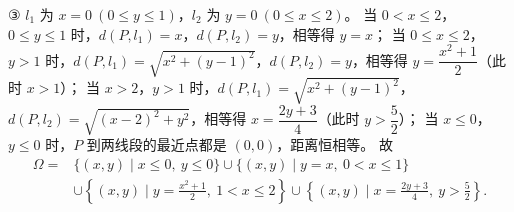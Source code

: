 \begin{answer}
③ $l_1$ 为 $x=0\ (0\leqslant y\leqslant1)$，$l_2$ 为 $y=0\ (0\leqslant x\leqslant2)$。
当 $0<x\leqslant2$，$0\leqslant y\leqslant1$ 时，$d(P,l_1)=x$，$d(P,l_2)=y$，相等得 $y=x$；
当 $0\leqslant x\leqslant2$，$y>1$ 时，$d(P,l_1)=\sqrt{x^2+(y-1)^2}$，$d(P,l_2)=y$，相等得 $y=\dfrac{x^2+1}2$（此时 $x>1$）；
当 $x>2$，$y>1$ 时，$d(P,l_1)=\sqrt{x^2+(y-1)^2}$，$d(P,l_2)=\sqrt{(x-2)^2+y^2}$，相等得 $x=\dfrac{2y+3}4$（此时 $y>\dfrac52$）；
当 $x\leqslant0$，$y\leqslant0$ 时，$P$ 到两线段的最近点都是 $(0,0)$，距离恒相等。
故
\nopagebreak[4]
\[\begin{aligned}\Omega={}&\{(x,y)\mid x\leqslant0,\ y\leqslant0\}\cup\{(x,y)\mid y=x,\ 0<x\leqslant1\}\\&\cup\left\{(x,y)\mid y=\frac{x^2+1}2,\ 1<x\leqslant2\right\}\cup\left\{(x,y)\mid x=\frac{2y+3}4,\ y>\frac52\right\}.\end{aligned}\]




\end{answer}